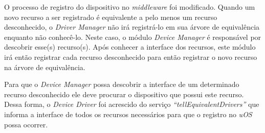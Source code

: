 O processo de registro do dispositivo no \emph{middleware} foi modificado. Quando um novo recurso a ser registrado é equivalente a pelo menos um recurso desconhecido, o \emph{Driver Manager} não irá registrá-lo em sua árvore de equivalência enquanto não conhecê-lo. Neste caso, o módulo \emph{Device Manager} é responsável por descobrir esse(s) recurso(s). Após conhecer a interface dos recursos, este módulo irá então registrar cada recurso desconhecido para então registrar o novo recurso na árvore de equivalência.

Para que o \emph{Device Manager} possa descobrir a interface de um determinado recurso desconhecido ele deve procurar o dispositivo que possui este recurso. Dessa forma, o \emph{Device Driver} foi acrescido do serviço \emph{``tellEquivalentDrivers''} que informa a interface de todos os recursos necessários para que o registro no \emph{uOS} possa ocorrer.